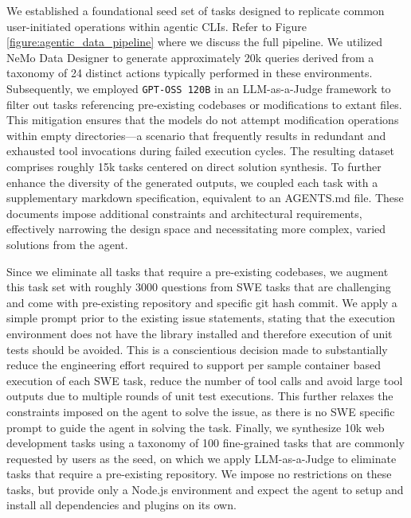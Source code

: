 We established a foundational seed set of tasks designed to replicate common user-initiated operations within agentic CLIs. Refer to Figure \ref{figure:agentic_data_pipeline} where we discuss the full pipeline. We utilized NeMo Data Designer \citep{nemo-data-designer} to generate approximately 20k queries derived from a taxonomy of 24 distinct actions typically performed in these environments. Subsequently, we employed \texttt{GPT-OSS 120B} \citep{openai2025gptoss120bgptoss20bmodel} in an LLM-as-a-Judge framework to filter out tasks referencing pre-existing codebases or modifications to extant files. This mitigation ensures that the models do not attempt modification operations within empty directories—a scenario that frequently results in redundant and exhausted tool invocations during failed execution cycles. The resulting dataset comprises roughly 15k tasks centered on direct solution synthesis. To further enhance the diversity of the generated outputs, we coupled each task with a supplementary markdown specification, equivalent to an AGENTS.md file. These documents impose additional constraints and architectural requirements, effectively narrowing the design space and necessitating more complex, varied solutions from the agent.

Since we eliminate all tasks that require a pre-existing codebases, we augment this task set with roughly 3000 questions from SWE tasks that are challenging and come with pre-existing repository and specific git hash commit. We apply a simple prompt prior to the existing issue statements, stating that the execution environment does not have the library installed and therefore execution of unit tests should be avoided. This is a conscientious decision made to substantially reduce the engineering effort required to support per sample container based execution of each SWE task, reduce the number of tool calls and avoid large tool outputs due to multiple rounds of unit test executions. This further relaxes the constraints imposed on the agent to solve the issue, as there is no SWE specific prompt to guide the agent in solving the task. Finally, we synthesize 10k web development tasks using a taxonomy of 100 fine-grained tasks that are commonly requested by users as the seed, on which we apply LLM-as-a-Judge to eliminate tasks that require a pre-existing repository. We impose no restrictions on these tasks, but provide only a Node.js environment and expect the agent to setup and install all dependencies and plugins on its own.

